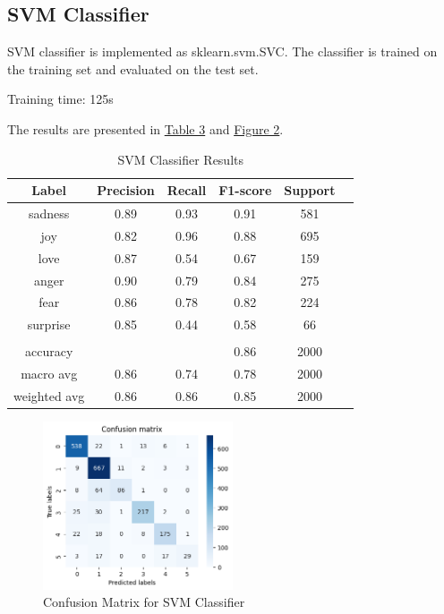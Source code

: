\documentclass{article}
\begin{document}
\subsection{SVM Classifier}
SVM classifier is implemented as sklearn.svm.SVC. The classifier is trained on the training set and evaluated on the test set.

Training time: 125s

The results are presented in \hyperref[table:svm_results_1]{Table 3} and \hyperref[fig:svm_confusion_matrix_1]{Figure 2}.

\begin{table}[h]
    \label{table:svm_results_1}
\centering
\begin{tabular}{|c|c|c|c|c|c|}
\hline
\textbf{Label} & \textbf{Precision} & \textbf{Recall} & \textbf{F1-score} & \textbf{Support} \\ \hline
sadness        & 0.89               & 0.93            & 0.91              & 581              \\ \hline
joy            & 0.82               & 0.96            & 0.88              & 695              \\ \hline
love           & 0.87               & 0.54            & 0.67              & 159              \\ \hline
anger          & 0.90               & 0.79            & 0.84              & 275              \\ \hline
fear           & 0.86               & 0.78            & 0.82              & 224              \\ \hline
surprise       & 0.85               & 0.44            & 0.58              & 66               \\ \hline
&  &  &  & \\ \hline
accuracy       &                     &                 & 0.86              & 2000             \\ \hline
macro avg      & 0.86               & 0.74            & 0.78              & 2000             \\ \hline
weighted avg   & 0.86               & 0.86            & 0.85              & 2000             \\ \hline
\end{tabular}
\bigskip
\caption{SVM Classifier Results}
\end{table}

\begin{figure}[h]
    \label{fig:svm_confusion_matrix_1}
    \centering
    \includegraphics[width=0.5\textwidth]{confusion_matrix_2_svm.png}
    \caption{Confusion Matrix for SVM Classifier}
\end{figure}
\end{document}
